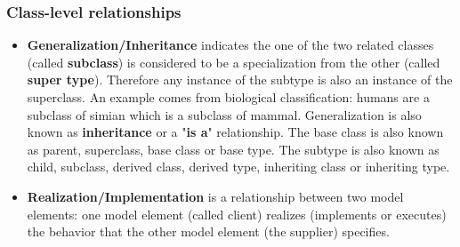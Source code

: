     \subsubsection{Class-level relationships}
    \begin{itemize}
        \item \textbf{Generalization/Inheritance} indicates the one of 
              the two related classes (called \textbf{subclass}) is 
              considered to be a specialization from the other (called 
              \textbf{super type}). Therefore any instance of the 
              subtype is also an instance of the superclass. An example 
              comes from biological classification: humans are a 
              subclass of simian which is a subclass of mammal.
              \newline
              Generalization is also known as \textbf{inheritance} or a 
              "\textbf{is a}" relationship. 
              \newline
              The base class is also known as parent, superclass, 
              base class or base type.
              \newline
              The subtype is also known as child, subclass, 
              derived class, derived type, inheriting class or 
              inheriting type.
        \item \textbf{Realization/Implementation} is a relationship 
              between two model elements: one model element (called 
              client) realizes (implements or executes) the behavior 
              that the other model element (the supplier) specifies.
    \end{itemize}

